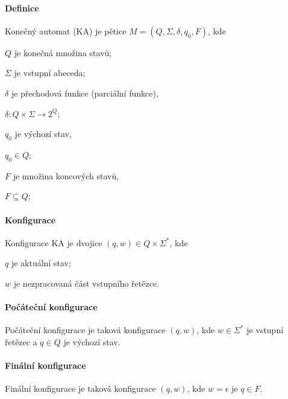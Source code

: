 \paragraph*{Definice} Konečný automat (KA) je pětice $M = (Q, \Sigma, \delta, q_0, F)$, kde \begin{compactitem}
    \item $Q$ je konečná množina stavů;
    \item $\Sigma$ je vstupní abeceda;
    \item $\delta$ je přechodová funkce (parciální funkce), \begin{compactitem}
        \item $\delta : Q \times \Sigma \rightarrow 2^{Q}$;
    \end{compactitem}
    \item $q_0$ je výchozí stav, \begin{compactitem}
        \item $q_0 \in Q$;
    \end{compactitem}
    \item $F$ je množina koncových stavů, \begin{compactitem}
        \item $F \subseteq Q$;
    \end{compactitem}
\end{compactitem}

\paragraph*{Konfigurace} Konfigurace KA je dvojice $(q, w) \in Q \times \Sigma^*$, kde \begin{compactitem}
    \item $q$ je aktuální stav;
    \item $w$ je nezpracovaná část vstupního řetězce.
\end{compactitem}

\paragraph*{Počáteční konfigurace} Počáteční konfigurace je taková konfigurace $(q, w)$, kde $w \in \Sigma^*$ je vstupní řetězec a $q \in Q$ je výchozí stav.

\paragraph*{Finální konfigurace} Finální konfigurace je taková konfigurace $(q, w)$, kde $w = \epsilon$ je $q \in F$.

